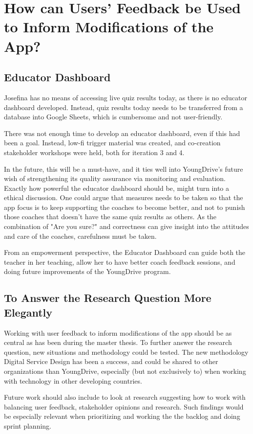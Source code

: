 \section{How can Users' Feedback be Used to Inform Modifications of the App?}

\subsection{Educator Dashboard}
Josefina has no means of accessing live quiz results today, as there is no educator dashboard developed. Instead, quiz results today needs to be transferred from a database into Google Sheets, which is cumbersome and not user-friendly.

There was not enough time to develop an educator dashboard, even if this had been a goal. Instead, low-fi trigger material was created, and co-creation stakeholder workshops were held, both for iteration 3 and 4.

In the future, this will be a must-have, and it ties well into YoungDrive's future wish of strengthening its quality assurance via monitoring and evaluation. Exactly how powerful the educator dashboard should be, might turn into a ethical discussion. One could argue that measures needs to be taken so that the app focus is to keep supporting the coaches to become better, and not to punish those coaches that doesn't have the same quiz results as others. As the combination of "Are you sure?" and correctness can give insight into the attitudes and care of the coaches, carefulness must be taken.

From an empowerment perspective, the Educator Dashboard can guide both the teacher in her teaching, allow her to have better coach feedback sessions, and doing future improvements of the YoungDrive program.

\subsection{To Answer the Research Question More Elegantly}
Working with user feedback to inform modifications of the app should be as central as has been during the master thesis. To further answer the research question, new situations and methodology could be tested. The new methodology Digital Service Design has been a success, and could be shared to other organizations than YoungDrive, especially (but not exclusively to) when working with technology in other developing countries.

Future work should also include to look at research suggesting how to work with balancing user feedback, stakeholder opinions and research. Such findings would be especially relevant when prioritizing and working the the backlog and doing sprint planning.

